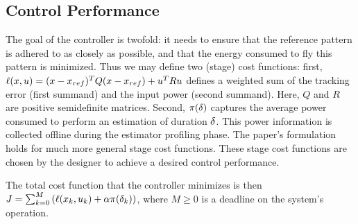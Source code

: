 \subsection{Control Performance}
The goal of the controller is twofold: it needs to ensure that the reference pattern is adhered to as closely as possible, and that the energy consumed to fly this pattern is minimized.
Thus we may define two (stage) cost functions: first, $\ell(x, u) = (x - x_{ref})^TQ(x - x_{ref}) + u^T R u$ defines a weighted sum of the tracking error (first summand) and the input power (second summand).
Here, $Q$ and $R$ are positive semidefinite matrices.
Second, $\pi(\delta)$ captures the average power consumed to perform an estimation of duration $\delta$.
This power information is collected offline during the estimator profiling phase.
The paper's formulation holds for much more general stage cost functions.
These stage cost functions are chosen by the designer to achieve a desired control performance.

The total cost function that the controller minimizes is then
\(
J=\sum_{k=0}^{M}\left(\ell(x_k,u_k)+ \alpha \pi(\delta_k)\right)
\),
where $M \geq 0$ is a deadline on the system's operation.

